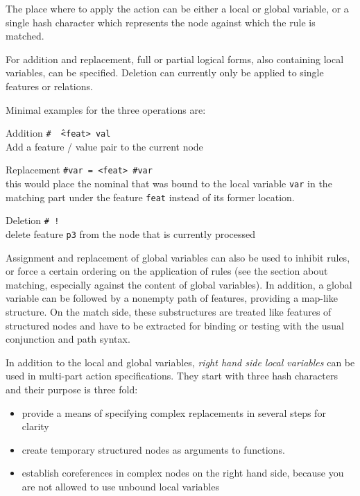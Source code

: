 \documentclass[11pt,a4paper]{report}
\newcommand{\cd}[1]{\texttt{#1}}
\begin{document}
The place where to apply the action can be either a local or global variable,
or a single hash character which represents the node against which the rule is
matched.

For addition and replacement, full or partial logical forms, also containing
local variables, can be specified. Deletion can currently only be applied to
single features or relations.
\newpage

Minimal examples for the three operations are:
\begin{list}{}{\setlength{\leftmargin}{3.2cm}\setlength{\labelwidth}{2.6cm}
\renewcommand{\makelabel}[1]{\textbf{#1}}}
\item[Addition] \cd{\# \^\  <feat> val}\\ Add a feature / value pair to the current
  node
\item[Replacement] \cd{\#var = <feat> \#var}\\ this would place the nominal that
  was bound to the local variable \cd{var} in the matching part under the
  feature \cd{feat} instead of its former location.
\item[Deletion] \cd{\# !\ <p3>}\\ delete feature \cd{p3} from the node that is
  currently processed
\end{list}

Assignment and replacement of global variables can also be used to inhibit
rules, or force a certain ordering on the application of rules (see the
section about matching, especially against the content of global variables).
In addition, a global variable can be followed by a nonempty path of features,
providing a map-like structure. On the match side, these substructures are
treated like features of structured nodes and have to be extracted for binding
or testing with the usual conjunction and path syntax.

In addition to the local and global variables, \emph{right hand side local
  variables} can be used in multi-part action specifications. They start
with three hash characters and their purpose is three fold:
\begin{itemize}
\item provide a means of specifying complex replacements in several steps for
  clarity
\item create temporary structured nodes as arguments to functions.
\item establish coreferences in complex nodes on the right hand side, because
  you are not allowed to use unbound local variables
\end{itemize}
\end{document}
